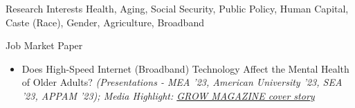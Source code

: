 \documentclass{resume} %
\begin{document}

\begin{rSection}{Research Interests}
Health, Aging, Social Security, Public Policy, Human Capital, Caste (Race), Gender, Agriculture, Broadband
\end{rSection}


\begin{rSection}{Job Market Paper}
\begin{itemize}
\item Does High-Speed Internet (Broadband) Technology Affect the Mental Health of Older Adults? \textit{\scriptsize{(Presentations - MEA '23, American University '23, SEA '23, APPAM '23); Media Highlight: \href{https://grow.cals.wisc.edu/departments/features/the-road-to-rural-broadband}{GROW MAGAZINE cover story}}} 
\end{itemize}


\end{rSection}
\end{document}
